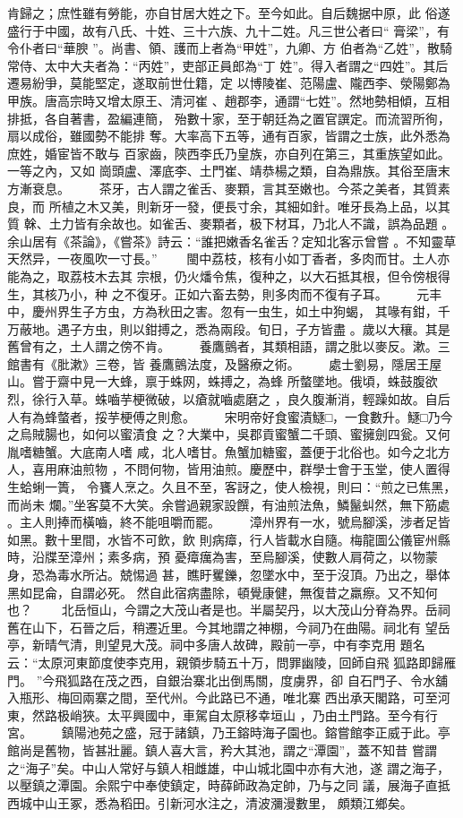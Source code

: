 \documentclass{ctexart}
\begin{document}
肯歸之；庶性雖有勞能，亦自甘居大姓之下。至今如此。自后魏据中原，此 俗遂盛行于中國，故有八氏、十姓、三十六族、九十二姓。凡三世公者曰`` 膏梁''，有令仆者曰``華腴 ''。尚書、領、護而上者為``甲姓''，九卿、方 伯者為``乙姓''，散騎常侍、太中大夫者為：``丙姓''，吏部正員郎為``丁 姓''。得入者謂之``四姓''。其后遷易紛爭，莫能堅定，遂取前世仕籍，定 以博陵崔、范陽盧、隴西李、滎陽鄭為甲族。唐高宗時又增太原王、清河崔 、趙郡李，通謂``七姓''。然地勢相傾，互相排抵，各自著書，盈編連簡， 殆數十家，至于朝廷為之置官譔定。而流習所徇，扇以成俗，雖國勢不能排 奪。大率高下五等，通有百家，皆謂之士族，此外悉為庶姓，婚宦皆不敢与 百家齒，陝西李氏乃皇族，亦自列在第三，其重族望如此。一等之內，又如 崗頭盧、澤底李、土門崔、靖恭楊之類，自為鼎族。其俗至唐末方漸衰息。 　　茶牙，古人謂之雀舌、麥顆，言其至嫩也。今茶之美者，其質素良，而 所植之木又美，則新牙一發，便長寸余，其細如針。唯牙長為上品，以其質 榦、土力皆有余故也。如雀舌、麥顆者，极下材耳，乃北人不識，誤為品題 。余山居有《茶論》，《嘗茶》詩云：``誰把嫩香名雀舌？定知北客示曾嘗 。不知靈草天然异，一夜風吹一寸長。'' 　　閩中荔枝，核有小如丁香者，多肉而甘。土人亦能為之，取荔枝木去其 宗根，仍火燔令焦，復种之，以大石抵其根，但令傍根得生，其核乃小，种 之不復牙。正如六畜去勢，則多肉而不復有子耳。 　　元丰中，慶州界生子方虫，方為秋田之害。忽有一虫生，如土中狗蝎， 其喙有鉗，千万蔽地。遇子方虫，則以鉗搏之，悉為兩段。旬日，子方皆盡 。歲以大穰。其是舊曾有之，土人謂之傍不肯。 　　養鷹鸇者，其類相語，謂之肶以麥反。漱。三館書有《肶漱》三卷，皆 養鷹鸇法度，及醫療之術。 　　處士劉易，隱居王屋山。嘗于齋中見一大蜂，禀于蛛网，蛛搏之，為蜂 所螫墜地。俄頃，蛛鼓腹欲烈，徐行入草。蛛嚙芋梗微破，以瘡就嚙處磨之 ，良久腹漸消，輕躁如故。自后人有為蜂螫者，挼芋梗傅之則愈。 　　宋明帝好食蜜漬鱁□，一食數升。鱁□乃今之烏賊腸也，如何以蜜漬食 之？大業中，吳郡貢蜜蟹二千頭、蜜擁劍四瓮。又何胤嗜糖蟹。大底南人嗜 咸，北人嗜甘。魚蟹加糖蜜，蓋便于北俗也。如今之北方人，喜用麻油煎物 ，不問何物，皆用油煎。慶歷中，群學士會于玉堂，使人置得生蛤蜊一簣， 令饔人烹之。久且不至，客訝之，使人檢視，則曰：``煎之已焦黑，而尚未 爛。''坐客莫不大笑。余嘗過親家設饌，有油煎法魚，鱗鬣虯然，無下筋處 。主人則捧而橫嚙，終不能咀嚼而罷。 　　漳州界有一水，號烏腳溪，涉者足皆如黑。數十里間，水皆不可飲，飲 則病瘴，行人皆載水自隨。梅龍圖公儀宦州縣時，沿牒至漳州；素多病，預 憂瘴癘為害，至烏腳溪，使數人肩荷之，以物蒙身，恐為毒水所沾。兢惕過 甚，瞧盱矍鑠，忽墜水中，至于沒頂。乃出之，舉体黑如昆侖，自謂必死。 然自此宿病盡除，頓覺康健，無復昔之羸瘵。又不知何也？ 　　北岳恒山，今謂之大茂山者是也。半屬契丹，以大茂山分脊為界。岳祠 舊在山下，石晉之后，稍遷近里。今其地謂之神棚，今祠乃在曲陽。祠北有 望岳亭，新晴气清，則望見大茂。祠中多唐人故碑，殿前一亭，中有李克用 題名云：``太原河東節度使李克用，親領步騎五十万，問罪幽陵，回師自飛 狐路即歸雁門。 ''今飛狐路在茂之西，自銀治寨北出倒馬關，度虜界，卻 自石門子、令水舖入瓶形、梅回兩寨之間，至代州。今此路已不通，唯北寨 西出承天閣路，可至河東，然路极峭狹。太平興國中，車駕自太原移幸垣山 ，乃由土門路。至今有行宮。 　　鎮陽池苑之盛，冠于諸鎮，乃王鎔時海子園也。鎔嘗館李正威于此。亭 館尚是舊物，皆甚壯麗。鎮人喜大言，矜大其池，謂之``潭園''，蓋不知昔 嘗謂之``海子''矣。中山人常好与鎮人相雌雄，中山城北園中亦有大池，遂 謂之海子，以壓鎮之潭園。余熙宁中奉使鎮定，時薛師政為定帥，乃与之同 議，展海子直抵西城中山王冢，悉為稻田。引新河水注之，清波瀰漫數里， 頗類江鄉矣。
\end{document}

